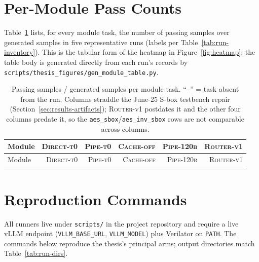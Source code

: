 
\label{app:modules}

\section{Per-Module Pass Counts}

Table~\ref{tab:module-appendix} lists, for every module task, the number
of passing samples over generated samples in five representative runs
(labels per Table~\ref{tab:run-inventory}). This is the tabular form of
the heatmap in Figure~\ref{fig:heatmap}; the table body is generated
directly from each run's records by
\texttt{scripts/thesis\_figures/gen\_module\_table.py}.

\begingroup
\small
\setlength{\tabcolsep}{5pt}
\begin{longtable}{lrrrrr}
  \caption[Per-module pass counts across runs]{Passing samples / generated
    samples per module task. ``--'' = task absent from the run. Columns
    straddle the June-25 S-box testbench repair
    (Section~\ref{sec:results-artifacts}); \textsc{Router-v1} postdates
    it and the other four columns predate it, so the
    \texttt{aes\_sbox}/\texttt{aes\_inv\_sbox} rows are not comparable
    across columns.}
  \label{tab:module-appendix} \\
  \toprule
  Module & \textsc{Direct-t0} & \textsc{Pipe-t0} & \textsc{Cache-off} & \textsc{Pipe-120b} & \textsc{Router-v1} \\
  \midrule
  \endfirsthead
  \toprule
  Module & \textsc{Direct-t0} & \textsc{Pipe-t0} & \textsc{Cache-off} & \textsc{Pipe-120b} & \textsc{Router-v1} \\
  \midrule
  \endhead
  \bottomrule
  \endfoot
  
\end{longtable}
\endgroup

\section{Reproduction Commands}

All runners live under \texttt{scripts/} in the project repository and
require a live vLLM endpoint (\texttt{VLLM\_BASE\_URL},
\texttt{VLLM\_MODEL}) plus Verilator on \texttt{PATH}. The commands below
reproduce the thesis's principal arms; output directories match
Table~\ref{tab:run-dirs}.

